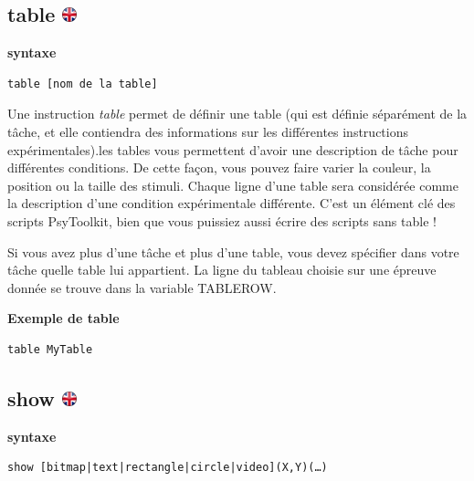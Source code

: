\documentclass[
]{book}
\begin{document}
\hypertarget{table}{%
\subsection[table ]{\texorpdfstring{table \href{https://www.psytoolkit.org/doc3.2.0/syntax.html\#table}{\protect\includegraphics{img/ukflag.png}}}{table }}\label{table}}

\textbf{syntaxe}

\begin{verbatim}
table [nom de la table]
\end{verbatim}

Une instruction \emph{table} permet de définir une table (qui est définie séparément de la tâche, et elle contiendra des informations sur les différentes instructions expérimentales).les tables vous permettent d'avoir une description de tâche pour différentes conditions. De cette façon, vous pouvez faire varier la couleur, la position ou la taille des stimuli. Chaque ligne d'une table sera considérée comme la description d'une condition expérimentale différente. C'est un élément clé des scripts PsyToolkit, bien que vous puissiez aussi écrire des scripts sans table !

Si vous avez plus d'une tâche et plus d'une table, vous devez spécifier dans votre tâche quelle table lui appartient. La ligne du tableau choisie sur une épreuve donnée se trouve dans la variable TABLEROW.

\textbf{Exemple de table}

\begin{verbatim}
table MyTable
\end{verbatim}

\hypertarget{show}{%
\subsection[show ]{\texorpdfstring{show \href{https://www.psytoolkit.org/doc3.2.0/syntax.html\#task-show}{\protect\includegraphics{img/ukflag.png}}}{show }}\label{show}}

\textbf{syntaxe}

\begin{verbatim}
show [bitmap|text|rectangle|circle|video](X,Y)(…)
\end{verbatim}
\end{document}
